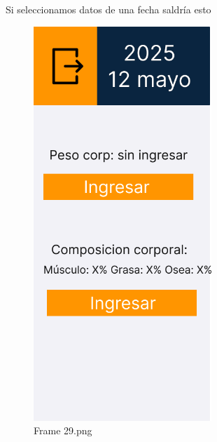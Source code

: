\newpage

Si seleccionamos datos de una fecha saldría esto
\begin{figure}[H]
   \centering
    \includegraphics[width=0.6\textwidth]{fotos/Frame 29.png}
    \caption{Frame 29.png}
    \label{fig:Frame_29}
\end{figure}

\newpage

